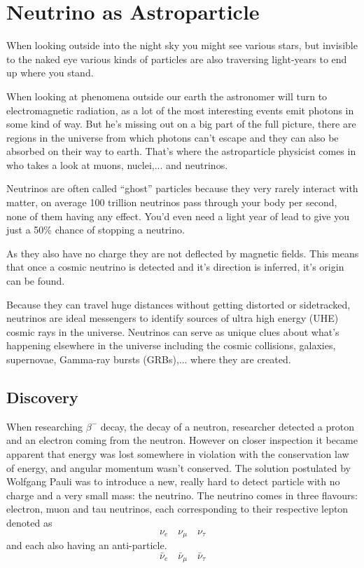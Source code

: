 \documentclass[11pt,a4paper,faculty=we,language=en,doctype=report]{cls/ugent-doc}
\begin{document}
\chapter{Neutrino as Astroparticle}

When looking outside into the night sky you might see various stars, but
invisible to the naked eye various kinds of particles are also traversing
light-years to end up where you stand.

When looking at phenomena outside our earth the astronomer will turn to
electromagnetic radiation, as a lot of the most interesting events emit photons
in some kind of way. But he's missing out on a big part of the full picture,
there are regions in the universe from which photons can't escape and they can
also be absorbed on their way to earth.  That's where the astroparticle
physicist comes in who takes a look at muons, nuclei,... and neutrinos.

Neutrinos are often called “ghost” particles because they very rarely interact
with matter, on average 100 trillion neutrinos pass through your body per
second, none of them having any effect.  You'd even need a light year of lead
to give you just a 50\% chance of stopping a neutrino.

As they also have no charge they are not deflected by magnetic fields. This means
that once a cosmic neutrino is detected and it's direction is inferred, it's origin
can be found.

Because they can travel huge distances without getting distorted or
sidetracked, neutrinos are ideal messengers to identify sources of ultra high
energy (UHE) cosmic rays in the universe.  Neutrinos can serve as unique clues
about what’s happening elsewhere in the universe including the cosmic
collisions, galaxies, supernovae, Gamma-ray bursts (GRBs),... where they are created.

\section{Discovery}
When researching $\beta^-$ decay, the decay of a neutron, researcher
detected a proton and an electron coming from the neutron. However
on closer inspection it became apparent that energy was lost
somewhere in violation with the conservation law of energy, and
angular momentum wasn't conserved.  The solution postulated by
Wolfgang Pauli was to introduce a new, really hard to detect
particle with no charge and a very small mass: the neutrino.  The neutrino comes in three flavours:
electron, muon and tau neutrinos, each corresponding to their respective lepton denoted as
\begin{equation}
	\nu_e \quad \nu_\mu \quad \nu_\tau
\end{equation}
and each also having an anti-particle.
\begin{equation}
	\bar{\nu}_e \quad \bar{\nu}_\mu \quad \bar{\nu}_\tau
\end{equation}
\end{document}
